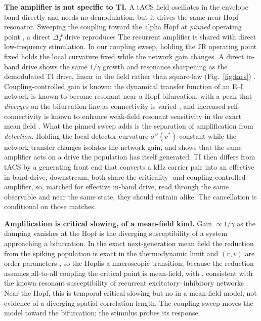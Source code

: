 \documentclass[11pt,a4paper]{article}
\newcommand{\Sig}{\sigma}
\providecommand{\DIFaddtex}[1]{{\protect\color{blue} \sf #1}} %
\providecommand{\DIFdeltex}[1]{{\protect\color{red} \scriptsize #1}} %
\providecommand{\DIFaddbegin}{} %
\providecommand{\DIFaddend}{} %
\providecommand{\DIFdelbegin}{} %
\providecommand{\DIFdelend}{} %
\providecommand{\DIFadd}[1]{\texorpdfstring{\DIFaddtex{#1}}{#1}} %
\providecommand{\DIFdel}[1]{\texorpdfstring{\DIFdeltex{#1}}{}} %
\begin{document}
\DIFdelbegin \DIFdel{\textbf{The amplifier is not specific to TI.} A tACS field oscillates in the envelope band
directly and needs no demodulation, but it drives the same near-Hopf resonator. Sweeping
the coupling toward the alpha Hopf at \emph{pinned} operating point , a direct $\Delta f$
drive reproduces }\DIFdelend \DIFaddbegin \DIFadd{The recurrent amplifier is shared with direct low-frequency stimulation. In our
coupling sweep, holding the JR operating point fixed holds the local curvature
fixed while the network gain changes. A direct in-band drive shows }\DIFaddend the same
$1/\gamma$ growth and resonance sharpening \DIFdelbegin \DIFdel{as the demodulated TI
drive, linear in the field rather than square-law }\DIFdelend (Fig.~\ref{fig:tacs})\DIFdelbegin \DIFdel{. Coupling-controlled gain is known: the dynamical transfer function of an E--I network is
known to become resonant near a Hopf bifurcation, with a peak that \emph{diverges} on the bifurcation line as connectivity is varied \cite{ledoux2011}, and increased
self-connectivity is known to enhance weak-field resonant sensitivity in the exact mean
field \cite{clusella2023}. What the pinned sweep adds is the separation of amplification
from \emph{detection}. Holding the local detector curvature $\Sig''(v^*)$ constant while
the network transfer changes isolates the network gain, and shows that the same amplifier
acts on a drive the population has itself generated. TI then differs from tACS by a
generating front end that converts a kHz carrier pair into an effective in-band drive;
downstream, both share the criticality- and coupling-controlled amplifier, so, matched for
effective in-band drive, read through the same observable and near the same state, they
should entrain alike. The cancellation is conditional on those matches.
}%

\DIFdel{\textbf{Amplification is critical slowing, of a mean-field kind.} Gain $\propto1/\gamma$
as the damping vanishes at the Hopf is the diverging susceptibility of a system
approaching a bifurcation. In the exact next-generation mean field the reduction from the
spiking population is exact in the thermodynamic limit and $(r,v)$ are order parameters
\cite{ott2008,montbrio2015}, so the Hopfis a macroscopic transition; because the
reduction assumes all-to-all coupling the critical point is mean-field, with }\DIFdelend \DIFaddbegin \DIFadd{, consistent with
the known resonant susceptibility of recurrent excitatory--inhibitory networks
\cite{ledoux2011,clusella2023}. Near the Hopf, this is }\DIFaddend temporal critical slowing
\DIFdelbegin \DIFdel{but no }\DIFdelend \DIFaddbegin \DIFadd{in a mean-field model, not evidence of a }\DIFaddend diverging spatial correlation length.
\DIFdelbegin \DIFdel{The coupling sweep moves
the model toward the bifurcation; the stimulus probes its response.
}%
\end{document}
